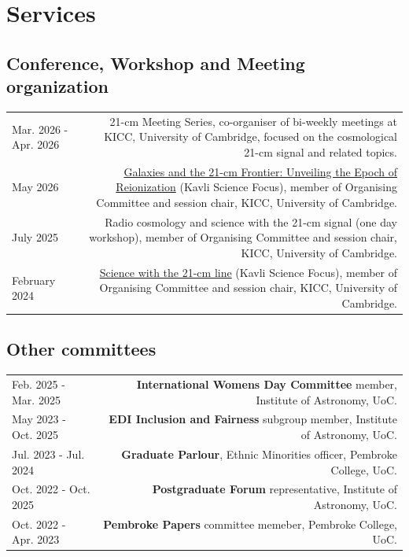 \documentclass{article}
\begin{document}
\section*{Services}

\subsection*{Conference, Workshop and Meeting organization}

\begin{longtable}{L!{\vrule}R}

  Mar. 2026 - Apr. 2026 & 21-cm Meeting Series, co-organiser of bi-weekly meetings at KICC, University of Cambridge, focused on the cosmological 21-cm signal and related topics. \\

  May 2026 & \href{https://www.kicc.cam.ac.uk/events/kavli-science-themed-meetings/galaxies-and-21-cm-frontier}{Galaxies and the 21-cm Frontier: Unveiling the Epoch of Reionization} (Kavli Science Focus), member of Organising Committee and session chair, KICC, University of Cambridge. \\

  July 2025  & Radio cosmology and science with the 21-cm signal (one day workshop), member of Organising Committee and session chair, KICC, University of Cambridge. \\

  February 2024 & \href{https://www.kicc.cam.ac.uk/events/kavli-science-themed-meetings/science-21-cm-hydrogen-line}{Science with the 21-cm line} (Kavli Science Focus), member of Organising Committee and session chair, KICC, University of Cambridge. \\

\end{longtable}

\subsection*{Other committees}

\begin{longtable}{L!{\vrule}R}

    Feb. 2025 - Mar. 2025 & \textbf{International Womens Day Committee} member, Institute of Astronomy, UoC. \\

    May 2023 - Oct. 2025 & \textbf{EDI Inclusion and Fairness} subgroup member, Institute of Astronomy, UoC. \\

    Jul. 2023 - Jul. 2024 & \textbf{Graduate Parlour}, Ethnic Minorities officer, Pembroke College, UoC. \\

    Oct. 2022 - Oct. 2025 & \textbf{Postgraduate Forum} representative, Institute of Astronomy, UoC. \\

    Oct. 2022 - Apr. 2023 & \textbf{Pembroke Papers} committee memeber, Pembroke College, UoC. \\

\end{longtable}
\end{document}

